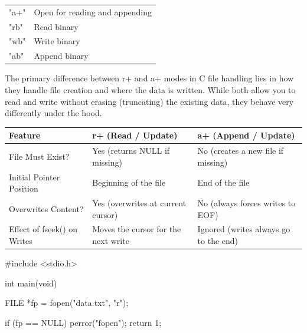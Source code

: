 \documentclass{report}
\begin{document}
\begin{itemize}
\begin{center}
\begin{tabularx}{\textwidth}{@{}lX@{}}
                    "a+"	&Open for reading and appending\\[2ex]
                    "rb"	&Read binary\\[2ex]
                    "wb"	&Write binary\\[2ex]
                    "ab"	&Append binary \\
                    \bottomrule
                \end{tabularx}
            \end{center}
            \bigbreak \noindent 
            The primary difference between r+ and a+ modes in C file handling lies in how they handle file creation and where the data is written. While both allow you to read and write without erasing (truncating) the existing data, they behave very differently under the hood. 
            \bigbreak \noindent 
            \begin{center}
                \begin{tabularx}{\textwidth}{@{}XXX@{}}
                    \toprule
                    \textbf{Feature}& \textbf{r+ (Read / Update)}&	\textbf{a+ (Append / Update)} \\
                    \midrule
                    File Must Exist?	&Yes (returns NULL if missing)	&No (creates a new file if missing)\\[2ex]
                    Initial Pointer Position	&Beginning of the file	&End of the file\\[2ex]
                    Overwrites Content?	&Yes (overwrites at current cursor)	&No (always forces writes to EOF)\\[2ex]
                    Effect of fseek() on Writes	&Moves the cursor for the next write	&Ignored (writes always go to the end) \\ 
                    \bottomrule
                \end{tabularx}
            \end{center}
            \bigbreak \noindent 
            \begin{cppcode}
                #include <stdio.h>

                int main(void) {
                    FILE *fp = fopen("data.txt", "r");

                    if (fp == NULL) {
                        perror("fopen");
                        return 1;
                    }

}
\end{cppcode}
\end{itemize}
\end{document}
